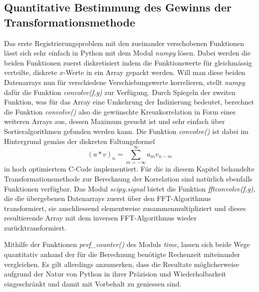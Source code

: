 \subsection{Quantitative Bestimmung des Gewinns der Transformationsmethode
\label{mellin:subsection:gewinn}}
Das erste Registrierungsproblem mit den zueinander verschobenen 
Funktionen lässt sich sehr einfach in Python mit dem Modul {\em numpy} 
lösen. 
Dabei werden die beiden Funktionen zuerst diskretisiert indem die 
Funktionswerte für gleichmässig verteilte, diskrete $x$-Werte in ein 
Array gepackt werden.
Will man diese beiden Datenarrays nun für verschiedene 
Verschiebungswerte korrelieren, stellt {\em numpy} dafür die Funktion 
{\em convolve(f,g)} zur Verfügung. 
Durch Spiegeln der zweiten Funktion, was für das Array eine Umkehrung 
der Indizierung bedeutet, berechnet die Funktion {\em convolve()} also 
die gewünschte Kreuzkorrelation in Form eines weiteren Arrays aus, 
dessen Maximum gesucht ist und sehr einfach über Sortieralgorithmen 
gefunden werden kann. 
Die Funktion {\em convolve()} ist dabei im Hintergrund gemäss der 
diskreten Faltungsformel
\[
    (a \ast v)_n = \sum_{m = -\infty}^{\infty} a_m v_{n-m}
\]
in hoch optimiertem C-Code implementiert.
Für die in diesem Kapitel behandelte Transformationsmethode zur 
Berechnung der Korrelation sind natürlich ebenfalls Funktionen verfügbar. 
Das Modul {\em scipy.signal} bietet die Funktion {\em fftconvolve(f,g)}, 
die die übergebenen Datenarrays zuerst über den FFT-Algorithmus 
transformiert, sie anschliessend elementweise zusammenmultipliziert 
und dieses resultierende Array mit dem inversen FFT-Algorithmus wieder 
zurücktransformiert.

Mithilfe der Funktionen {\em perf\_counter()} des Moduls {\em time}, 
lassen sich beide Wege quantitativ anhand der für die Berechnung 
benötigte Rechenzeit miteinander vergleichen.
Es gilt allerdings anzumerken, dass die Resultate möglicherweise 
aufgrund der Natur von Python in ihrer Präzision und Wiederholbarkeit 
eingeschränkt und damit mit Vorbehalt zu geniessen sind.

